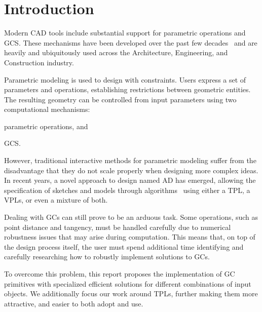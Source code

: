 \section{Introduction}%
\label{sec:intro}

Modern \ac{CAD} tools include substantial support for parametric operations and
\ac{GCS}.  These mechanisms have been developed over the past few
decades~\cite{Bettig:2011:GCSPC} and are heavily and ubiquitously used across
the Architecture, Engineering, and Construction industry.

Parametric modeling is used to design with constraints.  Users express a set of
parameters and operations, establishing restrictions between geometric entities.
The resulting geometry can be controlled from input parameters using two
computational mechanisms:
\begin{enumerate*}[label= (\arabic*)]
  \item parametric operations, and
  \item \ac{GCS}.
\end{enumerate*}

However, traditional interactive methods for parametric modeling suffer from the
disadvantage that they do not scale properly when designing more complex ideas.
In recent years, a novel approach to design named \ac{AD} has emerged, allowing
the specification of sketches and models through
algorithms~\cite{McCormack:2004:GDPDR} using either a \ac{TPL}, a \acp{VPL}, or
even a mixture of both.

Dealing with \acp{GC} can still prove to be an arduous task.  Some operations,
such as point distance and tangency, must be handled carefully due to numerical
robustness issues that may arise during computation.  This means that, on top of
the design process itself, the user must spend additional time identifying and
carefully researching how to robustly implement solutions to \acp{GC}.

To overcome this problem, this report proposes the implementation of \ac{GC}
primitives with specialized efficient solutions for different combinations of
input objects.  We additionally focus our work around \acp{TPL}, further making
them more attractive, and easier to both adopt and use.

% 
% 



